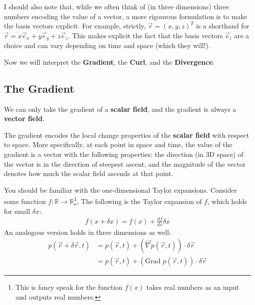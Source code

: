 I should also note that, while we often think of (in three dimensions) three numbers encoding the value of a vector, a more rigourous formulation is to make the basis vectors explicit. For example, strictly, \(\vec{r}=(x,y,z)^T\) is a shorthand for \(\vec{r}=x\vec{e}_x+y\vec{e}_y+z\vec{e}_z\). This makes explicit the fact that the basis vectors \(\vec{e}_i\) are a choice and can vary depending on time and space (which they will!).

Now we will interpret the \textbf{Gradient}, the \textbf{Curl}, and the \textbf{Divergence}.

\subsection{The Gradient}

We can only take the gradient of a \textbf{scalar field}, and the gradient is always a \textbf{vector field}.

The gradient encodes the local change properties of the \textbf{scalar field} with respect to space. More specifically, at each point in space and time, the value of the gradient is a vector with the following properties: the direction (in 3D space) of the vector is in the direction of steepest ascent, and the magnitude of the vector denotes how much the scalar field ascends at that point.

You should be familiar with the one-dimensional Taylor expansions. Consider some function \(f: \mathbb{R} \to \mathbb{R}\)\footnote{This is fancy speak for the function \(f(x)\) takes real numbers as an input and outputs real numbers.}. The following is the Taylor expansion of \(f\), which holds for small \(\delta x\):
\begin{align*}
    f(x+\delta x)=f(x)+\frac{df}{dx}\delta x
\end{align*}
An analogous version holds in three dimensions as well:
\begin{align*}
    p(\vec{r}+\delta\vec{r},t)&=p(\vec{r},t)+\left( \vec{\nabla}p(\vec{r},t) \right)\cdot \delta\vec{r}\\
    &=p(\vec{r},t)+\left( \text{Grad }p(\vec{r},t) \right)\cdot \delta\vec{r}
\end{align*}

